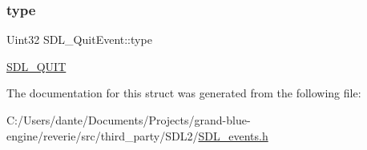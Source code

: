 \subsubsection{\texorpdfstring{type}{type}}
{\footnotesize\ttfamily Uint32 S\+D\+L\+\_\+\+Quit\+Event\+::type}

\mbox{\hyperlink{_s_d_l__events_8h_a3b589e89be6b35c02e0dd34a55f3fccaa31acc5fdafc86ebe2c1f5c3cae48d603}{S\+D\+L\+\_\+\+Q\+U\+IT}} 

The documentation for this struct was generated from the following file\+:\begin{DoxyCompactItemize}
\item 
C\+:/\+Users/dante/\+Documents/\+Projects/grand-\/blue-\/engine/reverie/src/third\+\_\+party/\+S\+D\+L2/\mbox{\hyperlink{_s_d_l__events_8h}{S\+D\+L\+\_\+events.\+h}}\end{DoxyCompactItemize}
